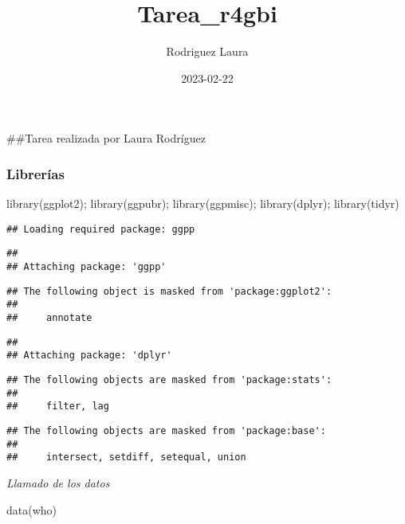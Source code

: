 \documentclass[
]{article}
\title{Tarea\_r4gbi}
\author{Rodriguez Laura}
\date{2023-02-22}
\newenvironment{Shaded}{\begin{snugshade}}{\end{snugshade}}
\newcommand{\FunctionTok}[1]{\textcolor[rgb]{0.00,0.00,0.00}{#1}}
\newcommand{\NormalTok}[1]{#1}
\newcommand{\StringTok}[1]{\textcolor[rgb]{0.31,0.60,0.02}{#1}}
\begin{document}
\maketitle

\#\#Tarea realizada por Laura Rodríguez

\hypertarget{libreruxedas}{%
\subsubsection{Librerías}\label{libreruxedas}}

\begin{Shaded}
\begin{Highlighting}[]
\FunctionTok{library}\NormalTok{(ggplot2); }\FunctionTok{library}\NormalTok{(ggpubr); }\FunctionTok{library}\NormalTok{(ggpmisc); }\FunctionTok{library}\NormalTok{(dplyr); }\FunctionTok{library}\NormalTok{(tidyr)}
\end{Highlighting}
\end{Shaded}

\begin{verbatim}
## Loading required package: ggpp
\end{verbatim}

\begin{verbatim}
## 
## Attaching package: 'ggpp'
\end{verbatim}

\begin{verbatim}
## The following object is masked from 'package:ggplot2':
## 
##     annotate
\end{verbatim}

\begin{verbatim}
## 
## Attaching package: 'dplyr'
\end{verbatim}

\begin{verbatim}
## The following objects are masked from 'package:stats':
## 
##     filter, lag
\end{verbatim}

\begin{verbatim}
## The following objects are masked from 'package:base':
## 
##     intersect, setdiff, setequal, union
\end{verbatim}

\emph{Llamado de los datos}

\begin{Shaded}
\begin{Highlighting}[]
\FunctionTok{data}\NormalTok{(}\StringTok{\textquotesingle{}who\textquotesingle{}}\NormalTok{)}
\end{Highlighting}
\end{Shaded}
\end{document}
